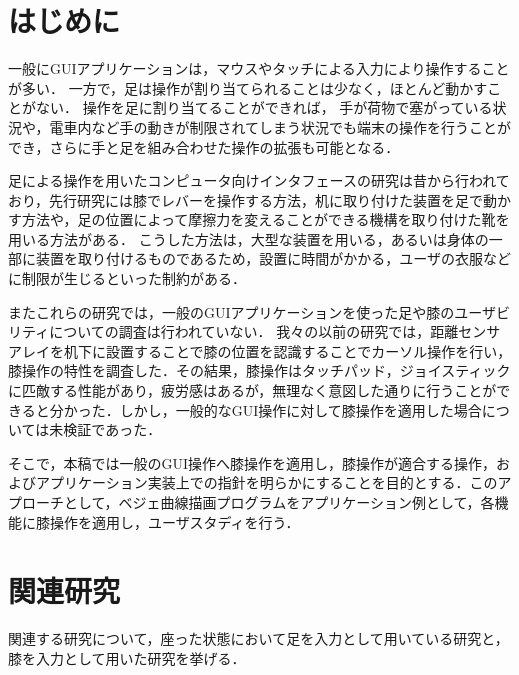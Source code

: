\documentclass[submit, techrep]{ipsj}
\begin{document}
\section{はじめに}
一般にGUIアプリケーションは，マウスやタッチによる入力により操作することが多い．
一方で，足は操作が割り当てられることは少なく，ほとんど動かすことがない．
操作を足に割り当てることができれば，
手が荷物で塞がっている状況\cite{Fan:2017:ESF:3123021.3123043}や，電車内など手の動きが制限されてしまう状況\cite{Fukahori:2015:ESF:2702123.2702308}でも端末の操作を行うことができ，さらに手と足を組み合わせた操作の拡張も可能となる．\par
足による操作を用いたコンピュータ向けインタフェースの研究は昔から行われており，先行研究には膝でレバーを操作する方法\cite{1698228}，机に取り付けた装置を足で動かす方法\cite{Pearson:1986:MMD:22627.22392, Pearson:1988:EEP:57167.57169}や，足の位置によって摩擦力を変えることができる機構を取り付けた靴\cite{Horodniczy:2017:FHE:3025453.3025625}を用いる方法がある．
こうした方法は，大型な装置を用いる，あるいは身体の一部に装置を取り付けるものであるため，設置に時間がかかる，ユーザの衣服などに制限が生じるといった制約がある．\par
またこれらの研究では，一般のGUIアプリケーションを使った足や膝のユーザビリティについての調査は行われていない．
我々の以前の研究\cite{weko_196526_1}では，距離センサアレイを机下に設置することで膝の位置を認識することでカーソル操作を行い，膝操作の特性を調査した．その結果，膝操作はタッチパッド，ジョイスティックに匹敵する性能があり，疲労感はあるが，無理なく意図した通りに行うことができると分かった．しかし，一般的なGUI操作に対して膝操作を適用した場合については未検証であった．\par
そこで，本稿では一般のGUI操作へ膝操作を適用し，膝操作が適合する操作，およびアプリケーション実装上での指針を明らかにすることを目的とする．このアプローチとして，ベジェ曲線描画プログラムをアプリケーション例として，各機能に膝操作を適用し，ユーザスタディを行う．

\section{関連研究}
関連する研究について，座った状態において足を入力として用いている研究と，膝を入力として用いた研究を挙げる．
\end{document}

